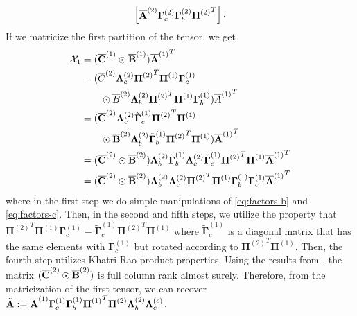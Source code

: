 \documentclass[journal]{IEEEtran}
\newcommand{\Ten}[1]{\mathcal{#1}}
\begin{document}
{\begin{align}
\begin{bmatrix}
    \overline{\bf A}^{(2)} \boldsymbol{\Gamma}_c^{(2)} \boldsymbol{\Gamma}_b^{(2)} {\boldsymbol{\Pi}^{(2)}}^T
    \end{bmatrix}.
\end{align}
If we matricize the first partition of the tensor, we get
\begin{align}\nonumber
    \Ten{X}_{1} &= (\overline{\bf C}^{(1)} \odot \overline{\bf B}^{(1)}) {\overline{\bf A}^{(1)}}^T\\\nonumber
    &= (\overline{C}^{(2)} \boldsymbol{\Lambda}_c^{(2)} {\boldsymbol{\Pi}^{(2)}}^T \boldsymbol{\Pi}^{(1)} \boldsymbol{\Gamma}_c^{(1)} \\\nonumber &\qquad\odot \overline{B}^{(2)} \boldsymbol{\Lambda}_b^{(2)} {\boldsymbol{\Pi}^{(2)}}^T \boldsymbol{\Pi}^{(1)} \boldsymbol{\Gamma}_b^{(1)}) {\overline{A}^{(1)}}^T\\\nonumber
    &=(\overline{\bf C}^{(2)} \boldsymbol{\Lambda}_c^{(2)} \tilde{\boldsymbol{\Gamma}}_c^{(1)}{\boldsymbol{\Pi}^{(2)}}^T \boldsymbol{\Pi}^{(1)} \\\nonumber &\qquad \odot \overline{\bf B}^{(2)} \boldsymbol{\Lambda}_b^{(2)} \tilde{\boldsymbol{\Gamma}}_b^{(1)}{\boldsymbol{\Pi}^{(2)}}^T \boldsymbol{\Pi}^{(1)}) {\overline{\bf A}^{(1)}}^T\\\nonumber
    &=(\overline{\bf C}^{(2)} \odot \overline{\bf B}^{(2)}) \boldsymbol{\Lambda}_b^{(2)} \tilde{\boldsymbol{\Gamma}}_b^{(1)} \boldsymbol{\Lambda}_c^{(2)} \tilde{\boldsymbol{\Gamma}}_c^{(1)} {\boldsymbol{\Pi}^{(2)}}^T \boldsymbol{\Pi}^{(1)} {\overline{\bf A}^{(1)}}^T\\\nonumber
    &=(\overline{\bf C}^{(2)} \odot \overline{\bf B}^{(2)}) \boldsymbol{\Lambda}_b^{(2)}  \boldsymbol{\Lambda}_c^{(2)}  {\boldsymbol{\Pi}^{(2)}}^T \boldsymbol{\Pi}^{(1)} {\boldsymbol{\Gamma}}_b^{(1)}{\boldsymbol{\Gamma}}_c^{(1)}{\overline{\bf A}^{(1)}}^T
\end{align}
where in the first step we do simple manipulations of \eqref{eq:factors-b} and \eqref{eq:factors-c}. Then, in the second and fifth steps, we utilize the property that ${\boldsymbol{\Pi}^{(2)}}^T \boldsymbol{\Pi}^{(1)} \boldsymbol{\Gamma}_c^{(1)} = \tilde{\boldsymbol{\Gamma}}_c^{(1)} {\boldsymbol{\Pi}^{(2)}}^T \boldsymbol{\Pi}^{(1)} $ where $\tilde{\boldsymbol{\Gamma}}_c^{(1)}$ is a diagonal matrix that has the same elements with ${\boldsymbol{\Gamma}}_c^{(1)}$ but rotated according to $ {\boldsymbol{\Pi}^{(2)}}^T \boldsymbol{\Pi}^{(1)} $. Then, the fourth step utilizes Khatri-Rao product properties. Using the results from \cite{jiang2001almost}, the matrix $(\overline{\bf C}^{(2)} \odot \overline{\bf B}^{(2)})$ is full column rank almost surely. Therefore, from the matricization of the first tensor, we can recover $\tilde{\bf A}:=\overline{\bf A}^{(1)} \boldsymbol{\Gamma}_c^{(1)} \boldsymbol{\Gamma}_b^{(1)} {\boldsymbol{\Pi}^{(1)}}^T \boldsymbol{\Pi}^{(2)} \boldsymbol{\Lambda}_b^{(2)} \boldsymbol{\Lambda}_c^{(c)}$.

}
\end{document}
